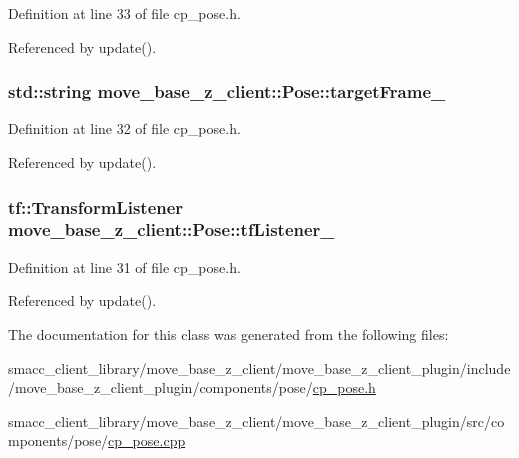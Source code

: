 Definition at line 33 of file cp\+\_\+pose.\+h.



Referenced by update().

\subsubsection[{\texorpdfstring{target\+Frame\+\_\+}{targetFrame_}}]{\setlength{\rightskip}{0pt plus 5cm}std\+::string move\+\_\+base\+\_\+z\+\_\+client\+::\+Pose\+::target\+Frame\+\_\+\hspace{0.3cm}{\ttfamily [private]}}\hypertarget{classmove__base__z__client_1_1Pose_a268cfb00a32306e9f8ec80479addda9e}{}\label{classmove__base__z__client_1_1Pose_a268cfb00a32306e9f8ec80479addda9e}


Definition at line 32 of file cp\+\_\+pose.\+h.



Referenced by update().

\subsubsection[{\texorpdfstring{tf\+Listener\+\_\+}{tfListener_}}]{\setlength{\rightskip}{0pt plus 5cm}tf\+::\+Transform\+Listener move\+\_\+base\+\_\+z\+\_\+client\+::\+Pose\+::tf\+Listener\+\_\+\hspace{0.3cm}{\ttfamily [private]}}\hypertarget{classmove__base__z__client_1_1Pose_ac932048a4bb8e389642c290b2c8dcefc}{}\label{classmove__base__z__client_1_1Pose_ac932048a4bb8e389642c290b2c8dcefc}


Definition at line 31 of file cp\+\_\+pose.\+h.



Referenced by update().



The documentation for this class was generated from the following files\+:\begin{DoxyCompactItemize}
\item 
smacc\+\_\+client\+\_\+library/move\+\_\+base\+\_\+z\+\_\+client/move\+\_\+base\+\_\+z\+\_\+client\+\_\+plugin/include/move\+\_\+base\+\_\+z\+\_\+client\+\_\+plugin/components/pose/\hyperlink{cp__pose_8h}{cp\+\_\+pose.\+h}\item 
smacc\+\_\+client\+\_\+library/move\+\_\+base\+\_\+z\+\_\+client/move\+\_\+base\+\_\+z\+\_\+client\+\_\+plugin/src/components/pose/\hyperlink{cp__pose_8cpp}{cp\+\_\+pose.\+cpp}\end{DoxyCompactItemize}
